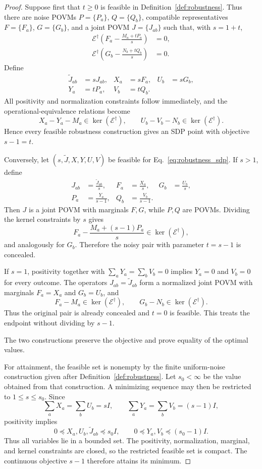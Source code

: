 \documentclass[
aps,pra,twocolumn,10pt,
superscriptaddress,longbibliography,floatfix
]{revtex4-2}
\begin{document}
\begin{proof}
Suppose first that $t\ge0$ is feasible in Definition~\ref{def:robustness}. Thus there are noise POVMs $P=\{P_a\}$, $Q=\{Q_b\}$, compatible representatives $F=\{F_a\}$, $G=\{G_b\}$, and a joint POVM $J=\{J_{ab}\}$ such that, with $s=1+t$,
\[
\begin{aligned}
\mathcal E^\dagger\!\left(
F_a-\frac{M_a+tP_a}{s}
\right)&=0,\\
\mathcal E^\dagger\!\left(
G_b-\frac{N_b+tQ_b}{s}
\right)&=0.
\end{aligned}
\]
Define
\begin{align*}
\widetilde J_{ab}&=sJ_{ab},&
X_a&=sF_a,&
U_b&=sG_b,\\
Y_a&=tP_a,&
V_b&=tQ_b.
\end{align*}
All positivity and normalization constraints follow immediately, and the operational-equivalence relations become
\[
X_a-Y_a-M_a\in\ker(\mathcal E^\dagger),\qquad
U_b-V_b-N_b\in\ker(\mathcal E^\dagger).
\]
Hence every feasible robustness construction gives an SDP point with objective $s-1=t$.

Conversely, let $(s,\widetilde J,X,Y,U,V)$ be feasible for Eq.~\eqref{eq:robustness_sdp}. If $s>1$, define
\begin{align*}
J_{ab}&=\frac{\widetilde J_{ab}}{s},&
F_a&=\frac{X_a}{s},&
G_b&=\frac{U_b}{s},\\
P_a&=\frac{Y_a}{s-1},&
Q_b&=\frac{V_b}{s-1}.
\end{align*}
Then $J$ is a joint POVM with marginals $F,G$, while $P,Q$ are POVMs. Dividing the kernel constraints by $s$ gives
\[
F_a-\frac{M_a+(s-1)P_a}{s}\in\ker(\mathcal E^\dagger),
\]
and analogously for $G_b$. Therefore the noisy pair with parameter $t=s-1$ is concealed.

If $s=1$, positivity together with $\sum_aY_a=\sum_bV_b=0$ implies $Y_a=0$ and $V_b=0$ for every outcome. The operators $J_{ab}=\widetilde J_{ab}$ form a normalized joint POVM with marginals $F_a=X_a$ and $G_b=U_b$, and
\[
F_a-M_a\in\ker(\mathcal E^\dagger),\qquad
G_b-N_b\in\ker(\mathcal E^\dagger).
\]
Thus the original pair is already concealed and $t=0$ is feasible. This treats the endpoint without dividing by $s-1$.

The two constructions preserve the objective and prove equality of the optimal values.

For attainment, the feasible set is nonempty by the finite uniform-noise construction given after Definition~\ref{def:robustness}. Let $s_0<\infty$ be the value obtained from that construction. A minimizing sequence may then be restricted to $1\le s\le s_0$. Since
\[
\sum_aX_a=\sum_bU_b=sI,
\qquad
\sum_aY_a=\sum_bV_b=(s-1)I,
\]
positivity implies
\[
0\preceq X_a,U_b,\widetilde J_{ab}\preceq s_0I,
\qquad
0\preceq Y_a,V_b\preceq(s_0-1)I.
\]
Thus all variables lie in a bounded set. The positivity, normalization, marginal, and kernel constraints are closed, so the restricted feasible set is compact. The continuous objective $s-1$ therefore attains its minimum.
\end{proof}
\end{document}
